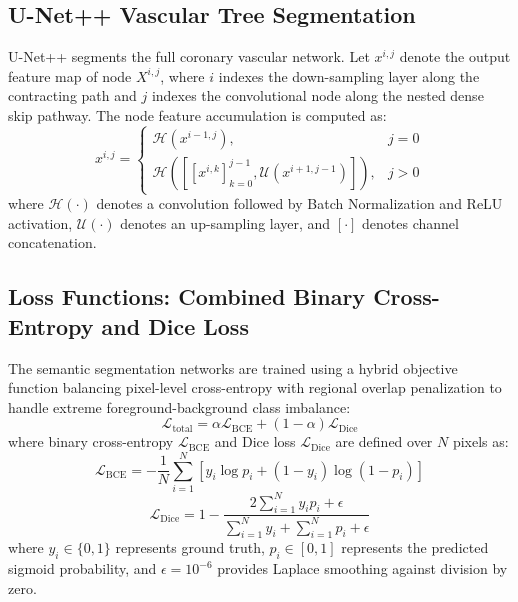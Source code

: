 \subsection{U-Net++ Vascular Tree Segmentation}
U-Net++ segments the full coronary vascular network. Let $x^{i,j}$ denote the output feature map of node $X^{i,j}$, where $i$ indexes the down-sampling layer along the contracting path and $j$ indexes the convolutional node along the nested dense skip pathway. The node feature accumulation is computed as:
\begin{equation}
x^{i,j} = \begin{cases} 
\mathcal{H}\left(x^{i-1,j}\right), & j=0 \\ 
\mathcal{H}\left( \left[ \left[x^{i,k}\right]_{k=0}^{j-1}, \mathcal{U}\left(x^{i+1,j-1}\right) \right] \right), & j > 0 
\end{cases}
\end{equation}
where $\mathcal{H}(\cdot)$ denotes a convolution followed by Batch Normalization and ReLU activation, $\mathcal{U}(\cdot)$ denotes an up-sampling layer, and $[\cdot]$ denotes channel concatenation.

\subsection{Loss Functions: Combined Binary Cross-Entropy and Dice Loss}
The semantic segmentation networks are trained using a hybrid objective function balancing pixel-level cross-entropy with regional overlap penalization to handle extreme foreground-background class imbalance:
\begin{equation}
\mathcal{L}_{\text{total}} = \alpha \mathcal{L}_{\text{BCE}} + (1 - \alpha) \mathcal{L}_{\text{Dice}}
\end{equation}
where binary cross-entropy $\mathcal{L}_{\text{BCE}}$ and Dice loss $\mathcal{L}_{\text{Dice}}$ are defined over $N$ pixels as:
\begin{equation}
\mathcal{L}_{\text{BCE}} = -\frac{1}{N} \sum_{i=1}^N \left[ y_i \log p_i + (1 - y_i) \log(1 - p_i) \right]
\end{equation}
\begin{equation}
\mathcal{L}_{\text{Dice}} = 1 - \frac{2 \sum_{i=1}^N y_i p_i + \epsilon}{\sum_{i=1}^N y_i + \sum_{i=1}^N p_i + \epsilon}
\end{equation}
where $y_i \in \{0, 1\}$ represents ground truth, $p_i \in [0, 1]$ represents the predicted sigmoid probability, and $\epsilon = 10^{-6}$ provides Laplace smoothing against division by zero.


